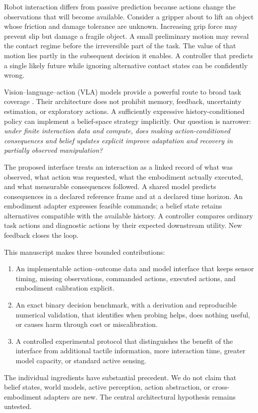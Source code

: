 \documentclass[11pt]{article}
\begin{document}
Robot interaction differs from passive prediction because actions change the observations that will become available. Consider a gripper about to lift an object whose friction and damage tolerance are unknown. Increasing grip force may prevent slip but damage a fragile object. A small preliminary motion may reveal the contact regime before the irreversible part of the task. The value of that motion lies partly in the subsequent decision it enables. A controller that predicts a single likely future while ignoring alternative contact states can be confidently wrong.

Vision--language--action (VLA) models provide a powerful route to broad task coverage \cite{rt2,openvla,pi0}. Their architecture does not prohibit memory, feedback, uncertainty estimation, or exploratory actions. A sufficiently expressive history-conditioned policy can implement a belief-space strategy implicitly. Our question is narrower: \emph{under finite interaction data and compute, does making action-conditioned consequences and belief updates explicit improve adaptation and recovery in partially observed manipulation?}

The proposed interface treats an interaction as a linked record of what was observed, what action was requested, what the embodiment actually executed, and what measurable consequences followed. A shared model predicts consequences in a declared reference frame and at a declared time horizon. An embodiment adapter expresses feasible commands; a belief state retains alternatives compatible with the available history. A controller compares ordinary task actions and diagnostic actions by their expected downstream utility. New feedback closes the loop.

This manuscript makes three bounded contributions:
\begin{enumerate}
\item An implementable action--outcome data and model interface that keeps sensor timing, missing observations, commanded actions, executed actions, and embodiment calibration explicit.
\item An exact binary decision benchmark, with a derivation and reproducible numerical validation, that identifies when probing helps, does nothing useful, or causes harm through cost or miscalibration.
\item A controlled experimental protocol that distinguishes the benefit of the interface from additional tactile information, more interaction time, greater model capacity, or standard active sensing.
\end{enumerate}
The individual ingredients have substantial precedent. We do not claim that belief states, world models, active perception, action abstraction, or cross-embodiment adapters are new. The central architectural hypothesis remains untested.
\end{document}

